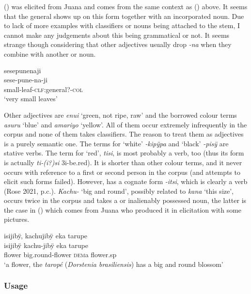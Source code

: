 () was elicited from Juana and comes from the same context as () above. It seems that the general  shows up on this form together with an incorporated noun. Due to lack of more examples with classifiers or nouns being attached to the stem, I cannot make any judgements about this being grammatical or not. It seems strange though considering that other adjectives usually drop \textit{-na} when they combine with another  or noun.

\ea\label{ex:small2-2}
\begingl
\glpreamble sesepunenaji\\
\gla sese-pune-na-ji\\
\glb small-leaf-\textsc{clf:}general?-\textsc{col}\\
\glft ‘very small leaves’
\endgl
\trailingcitation{[jxx-e081025s-1.187]}
\xe
{}

Other adjectives are \textit{enui} ‘green, not ripe, raw’ and the borrowed colour terms \textit{asuru} ‘blue’ and \textit{amariyo} ‘yellow’. All of them occur extremely infrequently in the corpus and none of them takes classifiers. The reason to treat them as adjectives is a purely semantic one. The terms for ‘white’ \textit{-kipÿpa} and ‘black’ \textit{-pisÿ} are stative verbs. The term for ‘red’, \textit{tisi}, is most probably a verb, too (thus its form is actually \textit{ti-(i?)si} 3i-be.red). It is shorter than other colour terms, and it never occurs with reference to a first or second person in the corpus (and attempts to elicit such forms failed). However,  has a cognate form \textit{-itsi}, which is clearly a verb (Rose 2021, p.c.). \textit{Kachu-} ‘big and round’, possibly related to \textit{kana} ‘this size’, occurs twice in the corpus and takes a  or inalienably possessed noun, the latter is the case in () which comes from Juana who produced it in elicitation with some pictures.

\ea\label{ex:biground}
\begingl
\glpreamble isijibÿ, kachujibÿ eka tarupe\\
\gla isijibÿ kachu-jibÿ eka tarupe\\
\glb flower big.round-flower \textsc{dem}a flower.sp\\
\glft ‘a flower, the \textit{taropé} (\textit{Dorstenia brasiliensis}) has a big and round blossom’
\endgl
\trailingcitation{[jcx-e090727s.027]}
\xe

\subsubsection{Usage}\label{sec:UsesADJ}

